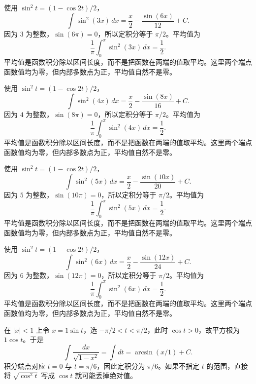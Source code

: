 \documentclass[UTF8,12pt,a4paper,fontset=fandol]{ctexart}
\begin{document}
\begin{solve}\label{ans:c14q9}
使用 $\sin^2t=(1-\cos2t)/2$，
\[
\int\sin^2(3x)\,dx=\frac x2-\frac{\sin(6x)}{12}+C.
\]
因为 $3$ 为整数，$\sin(6\pi)=0$，所以定积分等于 $\pi/2$。平均值为
\[
\frac1\pi\int_0^\pi\sin^2(3x)\,dx=\frac12.
\]
平均值是函数积分除以区间长度，而不是把函数在两端的值取平均。这里两个端点函数值均为零，但内部多数点为正，平均值自然不是零。
\end{solve}

\begin{solve}\label{ans:c14q10}
使用 $\sin^2t=(1-\cos2t)/2$，
\[
\int\sin^2(4x)\,dx=\frac x2-\frac{\sin(8x)}{16}+C.
\]
因为 $4$ 为整数，$\sin(8\pi)=0$，所以定积分等于 $\pi/2$。平均值为
\[
\frac1\pi\int_0^\pi\sin^2(4x)\,dx=\frac12.
\]
平均值是函数积分除以区间长度，而不是把函数在两端的值取平均。这里两个端点函数值均为零，但内部多数点为正，平均值自然不是零。
\end{solve}

\begin{solve}\label{ans:c14q11}
使用 $\sin^2t=(1-\cos2t)/2$，
\[
\int\sin^2(5x)\,dx=\frac x2-\frac{\sin(10x)}{20}+C.
\]
因为 $5$ 为整数，$\sin(10\pi)=0$，所以定积分等于 $\pi/2$。平均值为
\[
\frac1\pi\int_0^\pi\sin^2(5x)\,dx=\frac12.
\]
平均值是函数积分除以区间长度，而不是把函数在两端的值取平均。这里两个端点函数值均为零，但内部多数点为正，平均值自然不是零。
\end{solve}

\begin{solve}\label{ans:c14q12}
使用 $\sin^2t=(1-\cos2t)/2$，
\[
\int\sin^2(6x)\,dx=\frac x2-\frac{\sin(12x)}{24}+C.
\]
因为 $6$ 为整数，$\sin(12\pi)=0$，所以定积分等于 $\pi/2$。平均值为
\[
\frac1\pi\int_0^\pi\sin^2(6x)\,dx=\frac12.
\]
平均值是函数积分除以区间长度，而不是把函数在两端的值取平均。这里两个端点函数值均为零，但内部多数点为正，平均值自然不是零。
\end{solve}

\begin{solve}\label{ans:c14q13}
在 $|x|<1$ 上令 $x=1\sin t$，选 $-\pi/2<t<\pi/2$，此时 $\cos t>0$，故平方根为 $1\cos t$。于是
\[
\int\frac{dx}{\sqrt{1-x^2}}=\int dt=\arcsin(x/1)+C.
\]
积分端点对应 $t=0$ 与 $t=\pi/6$，因此定积分为 $\pi/6$。如果不指定 $t$ 的范围，直接将 $\sqrt{\cos^2t}$ 写成 $\cos t$ 就可能丢掉绝对值。
\end{solve}
\end{document}
